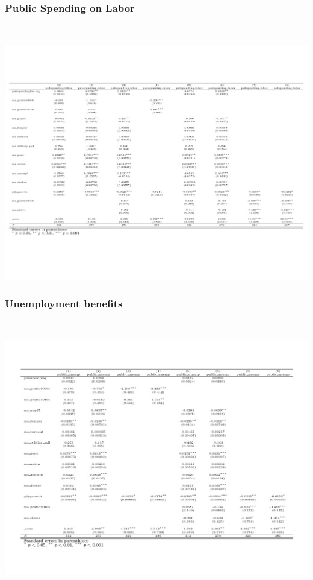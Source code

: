 \documentclass{beamer}
\begin{document}
\begin{frame}
\begin{itemize}
\begin{frame}
\frametitle{Public Spending on Labor}\
\begin{center}
\includegraphics[scale=0.35]{exp}
\end{center}
\end{frame}

\begin{frame}
\frametitle{Unemployment benefits}\
\begin{center}
\includegraphics[scale=0.35]{bene}
\end{center}
\end{frame}


\begin{frame}

\end{frame}
\end{itemize}
\end{frame}
\end{document}
